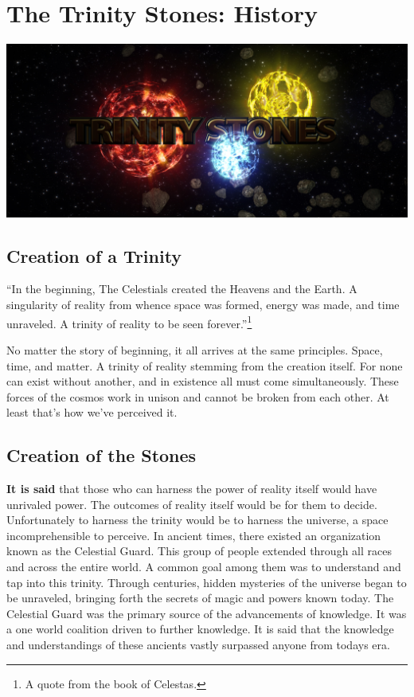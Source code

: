 \chapter{The Trinity Stones: History}

\begin{center}
	\includegraphics[width=\linewidth]{img/TS.jpg}
\end{center}


\section{Creation of a Trinity}

\begin{quotebox}
	``In the beginning, The Celestials created the Heavens and the Earth. A singularity of reality from whence space was formed, energy was made, and time unraveled. A trinity of reality to be seen forever.''\footnote{A quote from the book of Celestas.}
\end{quotebox}

No matter the story of beginning, it all arrives at the same principles. Space, time, and matter. A trinity of reality stemming from the creation itself. For none can exist without another, and in existence all must come simultaneously. These forces of the cosmos work in unison and cannot be broken from each other. At least that's how we've perceived it.

\section{Creation of the Stones}

\textbf{It is said} that those who can harness the power of reality itself would have unrivaled power. The outcomes of reality itself would be for them to decide. Unfortunately to harness the trinity would be to harness the universe, a space incomprehensible to perceive. In ancient times, there existed an organization known as the Celestial Guard. This group of people extended through all races and across the entire world. A common goal among them was to understand and tap into this trinity. Through centuries, hidden mysteries of the universe began to be unraveled, bringing forth the secrets of magic and powers known today. The Celestial Guard was the primary source of the advancements of knowledge. It was a one world coalition driven to further knowledge. It is said that the knowledge and understandings of these ancients vastly surpassed anyone from todays era. 

